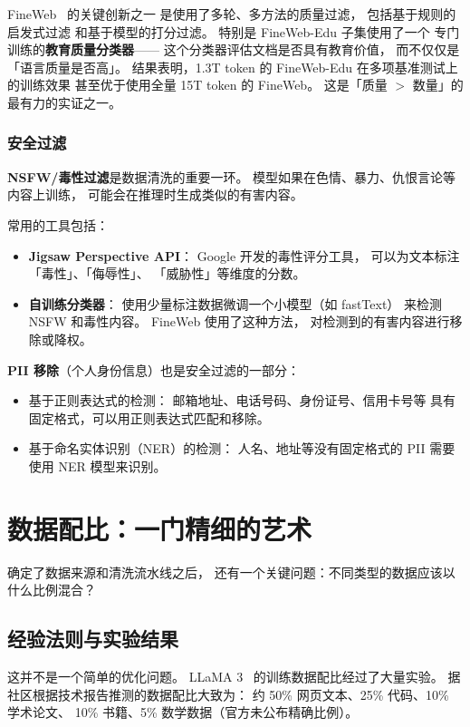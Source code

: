 FineWeb~\cite{penedo2024fineweb} 的关键创新之一
是使用了多轮、多方法的质量过滤，
包括基于规则的启发式过滤
和基于模型的打分过滤。
特别是 FineWeb-Edu 子集使用了一个
专门训练的\textbf{教育质量分类器}——
这个分类器评估文档是否具有教育价值，
而不仅仅是「语言质量是否高」。
结果表明，1.3T token 的 FineWeb-Edu
在多项基准测试上的训练效果
甚至优于使用全量 15T token 的 FineWeb。
这是「质量 $>$ 数量」的最有力的实证之一。

\subsubsection{安全过滤}

\textbf{NSFW/毒性过滤}是数据清洗的重要一环。
模型如果在色情、暴力、仇恨言论等内容上训练，
可能会在推理时生成类似的有害内容。

常用的工具包括：
\begin{itemize}[noitemsep]
  \item \textbf{Jigsaw Perspective API}：
        Google 开发的毒性评分工具，
        可以为文本标注「毒性」、「侮辱性」、
        「威胁性」等维度的分数。
  \item \textbf{自训练分类器}：
        使用少量标注数据微调一个小模型（如 fastText）
        来检测 NSFW 和毒性内容。
        FineWeb 使用了这种方法，
        对检测到的有害内容进行移除或降权。
\end{itemize}

\textbf{PII 移除}（个人身份信息）也是安全过滤的一部分：
\begin{itemize}[noitemsep]
  \item 基于正则表达式的检测：
        邮箱地址、电话号码、身份证号、信用卡号等
        具有固定格式，可以用正则表达式匹配和移除。
  \item 基于命名实体识别（NER）的检测：
        人名、地址等没有固定格式的 PII
        需要使用 NER 模型来识别。
\end{itemize}

\section{数据配比：一门精细的艺术}

确定了数据来源和清洗流水线之后，
还有一个关键问题：不同类型的数据应该以什么比例混合？

\subsection{经验法则与实验结果}

这并不是一个简单的优化问题。
LLaMA 3~\cite{dubey2024llama3} 的训练数据配比经过了大量实验。
据社区根据技术报告推测的数据配比大致为：
约 50\% 网页文本、25\% 代码、10\% 学术论文、
10\% 书籍、5\% 数学数据（官方未公布精确比例）。


